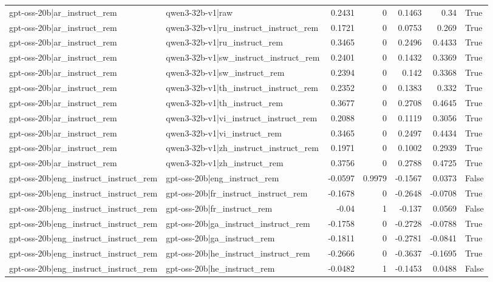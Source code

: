 \begin{table}
\begin{tabular}{l l r r r r l}
gpt-oss-20b|ar_instruct_rem & qwen3-32b-v1|raw & 0.2431 & 0 & 0.1463 & 0.34 & True \\
gpt-oss-20b|ar_instruct_rem & qwen3-32b-v1|ru_instruct_instruct_rem & 0.1721 & 0 & 0.0753 & 0.269 & True \\
gpt-oss-20b|ar_instruct_rem & qwen3-32b-v1|ru_instruct_rem & 0.3465 & 0 & 0.2496 & 0.4433 & True \\
gpt-oss-20b|ar_instruct_rem & qwen3-32b-v1|sw_instruct_instruct_rem & 0.2401 & 0 & 0.1432 & 0.3369 & True \\
gpt-oss-20b|ar_instruct_rem & qwen3-32b-v1|sw_instruct_rem & 0.2394 & 0 & 0.142 & 0.3368 & True \\
gpt-oss-20b|ar_instruct_rem & qwen3-32b-v1|th_instruct_instruct_rem & 0.2352 & 0 & 0.1383 & 0.332 & True \\
gpt-oss-20b|ar_instruct_rem & qwen3-32b-v1|th_instruct_rem & 0.3677 & 0 & 0.2708 & 0.4645 & True \\
gpt-oss-20b|ar_instruct_rem & qwen3-32b-v1|vi_instruct_instruct_rem & 0.2088 & 0 & 0.1119 & 0.3056 & True \\
gpt-oss-20b|ar_instruct_rem & qwen3-32b-v1|vi_instruct_rem & 0.3465 & 0 & 0.2497 & 0.4434 & True \\
gpt-oss-20b|ar_instruct_rem & qwen3-32b-v1|zh_instruct_instruct_rem & 0.1971 & 0 & 0.1002 & 0.2939 & True \\
gpt-oss-20b|ar_instruct_rem & qwen3-32b-v1|zh_instruct_rem & 0.3756 & 0 & 0.2788 & 0.4725 & True \\
gpt-oss-20b|eng_instruct_instruct_rem & gpt-oss-20b|eng_instruct_rem & -0.0597 & 0.9979 & -0.1567 & 0.0373 & False \\
gpt-oss-20b|eng_instruct_instruct_rem & gpt-oss-20b|fr_instruct_instruct_rem & -0.1678 & 0 & -0.2648 & -0.0708 & True \\
gpt-oss-20b|eng_instruct_instruct_rem & gpt-oss-20b|fr_instruct_rem & -0.04 & 1 & -0.137 & 0.0569 & False \\
gpt-oss-20b|eng_instruct_instruct_rem & gpt-oss-20b|ga_instruct_instruct_rem & -0.1758 & 0 & -0.2728 & -0.0788 & True \\
gpt-oss-20b|eng_instruct_instruct_rem & gpt-oss-20b|ga_instruct_rem & -0.1811 & 0 & -0.2781 & -0.0841 & True \\
gpt-oss-20b|eng_instruct_instruct_rem & gpt-oss-20b|he_instruct_instruct_rem & -0.2666 & 0 & -0.3637 & -0.1695 & True \\
gpt-oss-20b|eng_instruct_instruct_rem & gpt-oss-20b|he_instruct_rem & -0.0482 & 1 & -0.1453 & 0.0488 & False \\

\end{tabular}
\end{table}
